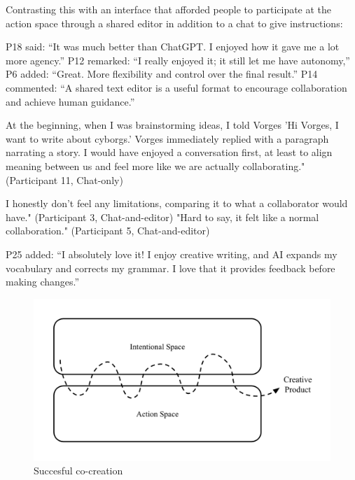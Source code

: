 Contrasting this with an interface that afforded people to participate at the action space through a shared editor in addition to a chat to give instructions:

P18 said: “It was much better than ChatGPT. I enjoyed how it gave me a lot more agency.”
P12 remarked: “I really enjoyed it; it still let me have autonomy,”
P6 added: “Great. More flexibility and control over the final result.”
P14 commented: “A shared text editor is a useful format to encourage collaboration and achieve human guidance.”













At the beginning, when I was brainstorming ideas, I told Vorges ’Hi Vorges, I want to write about cyborgs.’
Vorges immediately replied with a paragraph narrating a story. I would have enjoyed a conversation first,
at least to align meaning between us and feel more like we are actually collaborating." (Participant 11, Chat-only)


I honestly don’t feel any limitations, comparing it to what a collaborator would have." (Participant 3,
Chat-and-editor)
"Hard to say, it felt like a normal collaboration." (Participant 5, Chat-and-editor)

P25 added: “I absolutely love it! I enjoy creative writing, and AI expands my vocabulary and corrects my grammar. I
love that it provides feedback before making changes.”





\begin{figure}
    \centering
    \includegraphics[width=1\linewidth]{succesfulcreativity.png}
    \caption{Succesful co-creation}
    \label{fig:enter-label}
\end{figure}



